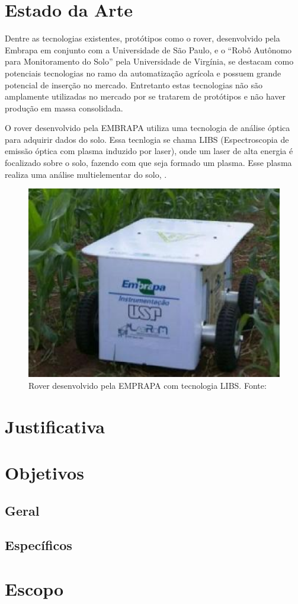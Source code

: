   \section{Estado da Arte}

  Dentre as tecnologias existentes, protótipos como o rover, desenvolvido pela
  Embrapa em conjunto com a Universidade de São Paulo, e o “Robô Autônomo para
  Monitoramento do Solo” pela Universidade de Virgínia, se destacam como
  potenciais tecnologias no ramo da automatização agrícola e possuem grande
  potencial de inserção no mercado.  Entretanto estas tecnologias não são
  amplamente utilizadas no mercado por se tratarem de protótipos e não haver
  produção em massa consolidada.

  O rover desenvolvido pela EMBRAPA utiliza uma tecnologia de análise óptica
  para adquirir dados do solo. Essa tecnlogia se chama LIBS (Espectroscopia de
  emissão óptica com plasma induzido por laser), onde um laser de alta energia
  é focalizado sobre o solo, fazendo com que seja formado um plasma.
  Esse plasma realiza uma análise multielementar do solo, \cite{ARCHILA2014}.

  \begin{figure}[h]
    \centering
    \label{fig01}
      \includegraphics[keepaspectratio=true,scale=0.5]{figuras/fig02.eps}
    \caption{Rover desenvolvido pela EMPRAPA com tecnologia LIBS. Fonte: \cite{ARCHILA2014}}
  \end{figure}

  \section{Justificativa}

  \section{Objetivos}
  \subsection{Geral}
  \subsection{Específicos}

  \section{Escopo}

